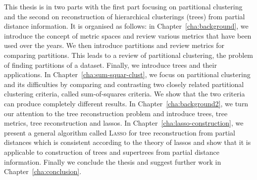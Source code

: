 This thesis is in two parts with the first part focusing on partitional
clustering and the second on reconstruction of hierarchical clusterings
(trees) from partial distance information.  It is organised as follows: in
Chapter~\ref{cha:background}, we introduce the concept of metric spaces and
review various metrics that have been used over the years.  We then introduce
partitions and review metrics for comparing partitions.  This leads to a
review of partitional clustering, the problem of finding partitions of a
dataset.  Finally, we introduce trees and their applications.  In
Chapter~\ref{cha:sum-squar-clust}, we focus on partitional clustering and its
difficulties by comparing and contrasting two closely related partitional
clustering criteria, called sum-of-squares criteria.  We show that the two
criteria can produce completely different results.  In
Chapter~\ref{cha:background2}, we turn our attention to the tree
reconstruction problem and introduce trees, tree metrics, tree reconstruction
and lassos.
In Chapter~\ref{cha:lasso-construction}, we present a general algorithm called
\textsc{Lasso} for tree reconstruction from partial distances which is
consistent according to the theory of lassos and show that it is applicable to
construction of trees and supertrees from partial distance information.
Finally we conclude the thesis and suggest further work in
Chapter~\ref{cha:conclusion}.

